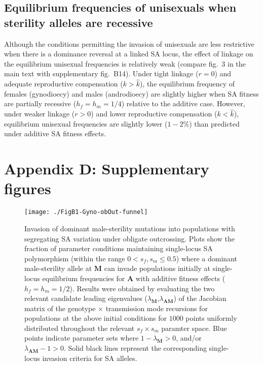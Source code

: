 \documentclass{article}
\begin{document}
\subsection*{Equilibrium frequencies of unisexuals when sterility alleles are recessive}
Although the conditions permitting the invasion of unisexuals are less restrictive when there is a dominance reversal at a linked SA locus, the effect of linkage on the equilibrium unisexual frequencies is relatively weak (compare fig.~3 in the main text with supplementary fig.~B14). Under tight linkage ($r = 0$) and adequate reproductive compensation ($k > \hat{k}$), the equilibrium frequency of females (gynodioecy) and males (androdioecy) are slightly higher when SA fitness are partially recessive ($h_f = h_m = 1/4$) relative to the additive case. However, under weaker linkage ($r > 0$) and lower reproductive compensation ($k < \hat{k}$), equilibrium unisexual frequencies are slightly lower ($1 - 2 \%$) than predicted under additive SA fitness effects.

\newpage{}


\section*{Appendix D: Supplementary figures}
\renewcommand{\theequation}{D\arabic{equation}}
\setcounter{equation}{0}
\renewcommand{\thefigure}{D\arabic{figure}}
\setcounter{figure}{0}

\begin{figure}[ht!]
\centering
\texttt{[image: ./FigB1-Gyno-obOut-funnel]}
\caption{Invasion of dominant male-sterility mutations into populations with segregating SA variation under obligate outcrossing. Plots show the fraction of parameter conditions maintaining single-locus SA polymorphism (within the range $0 < s_f,s_m \leq 0.5$) where a dominant male-sterility allele at $\mathbf{M}$ can invade populations initially at single-locus equilibrium frequencies for $\mathbf{A}$ with additive fitness effects ($h_f=h_m=1/2$). Results were obtained by evaluating the two relevant candidate leading eigenvalues ($\lambda_{\mathbf{M}}$,$\lambda_{\mathbf{AM}}$) of the Jacobian matrix of the genotype $\times$ transmission mode recursions for populations at the above initial conditions for $1000$ points uniformly distributed throughout the relevant $s_f \times s_m$ paramter space. Blue points indicate parameter sets where $1 - \lambda_{\mathbf{M}} > 0$, and/or $\lambda_{\mathbf{AM}} - 1 > 0$. Solid black lines represent the corresponding single-locus invasion criteria for SA alleles.}
\label{fig:GynObOutFunnel}
\end{figure}
\newpage{}
\end{document}
